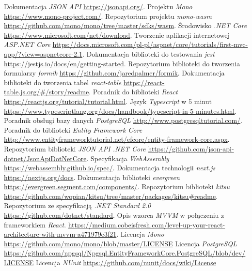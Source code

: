 \documentclass[a4paper,11pt,twoside]{report}
\theoremstyle{definition}
\begin{document}
\begin{thebibliography}{25}%
	 Dokumentacja \emph{JSON API} \url{https://jsonapi.org/}.
	 Projektu \emph{Mono} \url{https://www.mono-project.com/}.
	 Repozytorium projektu \emph{mono-wasm} \url{https://github.com/mono/mono/tree/master/sdks/wasm}.
	 Środowisko \emph{.NET Core} \url{https://www.microsoft.com/net/download}.
	 Tworzenie aplikacji internetowej \emph{ASP.NET Core} \url{https://docs.microsoft.com/pl-pl/aspnet/core/tutorials/first-mvc-app/?view=aspnetcore-2.1}.
	 Dokumentacja biblioteki do testowania \emph{jest} \url{https://jestjs.io/docs/en/getting-started}.
	 Repozytorium biblioteki do tworzenia formularzy \emph{formik} \url{https://github.com/jaredpalmer/formik}.
	 Dokumentacja biblioteki do tworzenia tabel \emph{react-table} \url{https://react-table.js.org/#/story/readme}.
	 Poradnik do biblioteki \emph{React} \url{https://reactjs.org/tutorial/tutorial.html}.
	 Język \emph{Typescript} w 5 minut \url{https://www.typescriptlang.org/docs/handbook/typescript-in-5-minutes.html}.
	 Poradnik obsługi bazy danych \emph{PostgreSQL} \url{http://www.postgresqltutorial.com/}.
	 Poradnik do biblioteki \emph{Entity Framework Core} \url{http://www.entityframeworktutorial.net/efcore/entity-framework-core.aspx}.
	 Repozytorium biblioteki \emph{JSON API .NET Core} \url{https://github.com/json-api-dotnet/JsonApiDotNetCore}.
	 Specyfikacja \emph{WebAssembly} \url{https://webassembly.github.io/spec/}.
	 Dokumentacja technologii \emph{next.js} \url{https://nextjs.org/docs}.
	 Dokumentacja biblioteki \emph{evergreen} \url{https://evergreen.segment.com/components/}.
	 Repozytorium biblioteki \emph{kitsu} \url{https://github.com/wopian/kitsu/tree/master/packages/kitsu#readme}.
	 Repozytorium ze specyfikacją \emph{.NET Standard 2.0} \url{https://github.com/dotnet/standard}.
	 Opis wzorca \emph{MVVM} w połączeniu z frameworkiem \emph{React}. \url{https://medium.cobeisfresh.com/level-up-your-react-architecture-with-mvvm-a471979e3f21}.
	 Licencja \emph{Mono} \url{https://github.com/mono/mono/blob/master/LICENSE}
	 Licencja \emph{PostgreSQL} \url{https://github.com/npgsql/Npgsql.EntityFrameworkCore.PostgreSQL/blob/dev/LICENSE}
	 Licencja \emph{NUnit} \url{https://github.com/nunit/docs/wiki/License}
\end{thebibliography}
\end{document}
